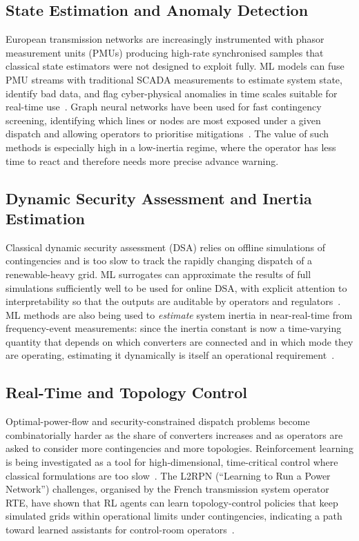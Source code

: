 \documentclass[conference]{IEEEtran}
\begin{document}
\subsection{State Estimation and Anomaly Detection}
European transmission networks are increasingly instrumented with phasor measurement units (PMUs) producing high-rate synchronised samples that classical state estimators were not designed to exploit fully. ML models can fuse PMU streams with traditional SCADA measurements to estimate system state, identify bad data, and flag cyber-physical anomalies in time scales suitable for real-time use~\cite{duchesne2020ml}. Graph neural networks have been used for fast contingency screening, identifying which lines or nodes are most exposed under a given dispatch and allowing operators to prioritise mitigations~\cite{donnot2018contingencies}. The value of such methods is especially high in a low-inertia regime, where the operator has less time to react and therefore needs more precise advance warning.

\subsection{Dynamic Security Assessment and Inertia Estimation}
Classical dynamic security assessment (DSA) relies on offline simulations of contingencies and is too slow to track the rapidly changing dispatch of a renewable-heavy grid. ML surrogates can approximate the results of full simulations sufficiently well to be used for online DSA, with explicit attention to interpretability so that the outputs are auditable by operators and regulators~\cite{cremer2019interpretable}. ML methods are also being used to \emph{estimate} system inertia in near-real-time from frequency-event measurements: since the inertia constant is now a time-varying quantity that depends on which converters are connected and in which mode they are operating, estimating it dynamically is itself an operational requirement~\cite{tielens2016relevance}.

\subsection{Real-Time and Topology Control}
Optimal-power-flow and security-constrained dispatch problems become combinatorially harder as the share of converters increases and as operators are asked to consider more contingencies and more topologies. Reinforcement learning is being investigated as a tool for high-dimensional, time-critical control where classical formulations are too slow~\cite{glavic2017rl}. The L2RPN (``Learning to Run a Power Network'') challenges, organised by the French transmission system operator RTE, have shown that RL agents can learn topology-control policies that keep simulated grids within operational limits under contingencies, indicating a path toward learned assistants for control-room operators~\cite{marot2020l2rpn}.
\end{document}
